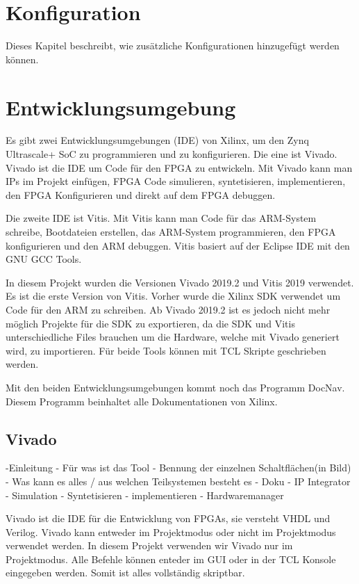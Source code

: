 \documentclass{article}
\begin{document}
\section{Konfiguration}
Dieses Kapitel beschreibt, wie zusätzliche Konfigurationen hinzugefügt werden können.

\section{Entwicklungsumgebung}
Es gibt zwei Entwicklungsumgebungen (IDE) von Xilinx, um den Zynq Ultrascale+ SoC zu programmieren und zu konfigurieren. Die eine ist Vivado. Vivado ist die IDE um Code für den FPGA zu entwickeln. Mit Vivado kann man IPs im Projekt einfügen, FPGA Code simulieren, syntetisieren, implementieren, den FPGA Konfigurieren und direkt auf dem FPGA debuggen.

Die zweite IDE ist Vitis. Mit Vitis kann man Code für das ARM-System schreibe, Bootdateien erstellen, das ARM-System programmieren, den FPGA konfigurieren und den ARM debuggen. Vitis basiert auf der Eclipse IDE mit den GNU GCC Tools.

In diesem Projekt wurden die Versionen Vivado 2019.2 und Vitis 2019 verwendet. Es ist die erste Version von Vitis. Vorher wurde die Xilinx SDK verwendet um Code für den ARM zu schreiben. Ab Vivado 2019.2 ist es jedoch nicht mehr möglich Projekte für die SDK zu exportieren, da die SDK und Vitis unterschiedliche Files brauchen um die Hardware, welche mit Vivado generiert wird, zu importieren. Für beide Tools können mit TCL Skripte geschrieben werden.

Mit den beiden Entwicklungsumgebungen kommt noch das Programm DocNav. Diesem Programm beinhaltet alle Dokumentationen von Xilinx.
\subsection{Vivado}
-Einleitung
    - Für was ist das Tool
    - Bennung der einzelnen Schaltflächen(in Bild)
    - Was kann es alles / aus welchen Teilsystemen besteht es
    - Doku
- IP Integrator
- Simulation
- Syntetisieren
- implementieren
- Hardwaremanager

Vivado ist die IDE für die Entwicklung von FPGAs, sie versteht VHDL und Verilog. Vivado kann entweder im Projektmodus oder nicht im Projektmodus verwendet werden. In diesem Projekt verwenden wir Vivado nur im Projektmodus. Alle Befehle können enteder im GUI oder in der TCL Konsole eingegeben werden. Somit ist alles vollständig skriptbar. 
\end{document}
